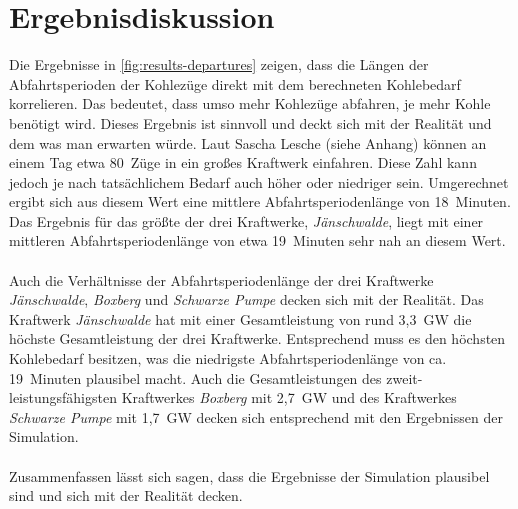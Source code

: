 \section{Ergebnisdiskussion}

Die Ergebnisse in \autoref{fig:results-departures} zeigen, dass die Längen der Abfahrtsperioden der Kohlezüge direkt mit dem berechneten Kohlebedarf korrelieren. Das bedeutet, dass umso mehr Kohlezüge abfahren, je mehr Kohle benötigt wird. Dieses Ergebnis ist sinnvoll und deckt sich mit der Realität und dem was man erwarten würde. Laut Sascha Lesche (siehe Anhang) können an einem Tag etwa 80~Züge in ein großes Kraftwerk einfahren. Diese Zahl kann jedoch je nach tatsächlichem Bedarf auch höher oder niedriger sein. Umgerechnet ergibt sich aus diesem Wert eine mittlere Abfahrtsperiodenlänge von 18~Minuten. Das Ergebnis für das größte der drei Kraftwerke, \emph{Jänschwalde}, liegt mit einer mittleren Abfahrtsperiodenlänge von etwa 19~Minuten sehr nah an diesem Wert. \\
\\
Auch die Verhältnisse der Abfahrtsperiodenlänge der drei Kraftwerke \emph{Jänschwalde}, \emph{Boxberg} und \emph{Schwarze Pumpe} decken sich mit der Realität. Das Kraftwerk \emph{Jänschwalde} hat mit einer Gesamtleistung von rund 3,3~GW die höchste Gesamtleistung der drei Kraftwerke. Entsprechend muss es den höchsten Kohlebedarf besitzen, was die niedrigste Abfahrtsperiodenlänge von ca. 19~Minuten plausibel macht. Auch die Gesamtleistungen des zweit-leistungsfähigsten Kraftwerkes \emph{Boxberg} mit 2,7~GW und des Kraftwerkes \emph{Schwarze Pumpe} mit 1,7~GW decken sich entsprechend mit den Ergebnissen der Simulation. \cite{noauthor_bundesnetzagentur_nodate}\\
\\
Zusammenfassen lässt sich sagen, dass die Ergebnisse der Simulation plausibel sind und sich mit der Realität decken.